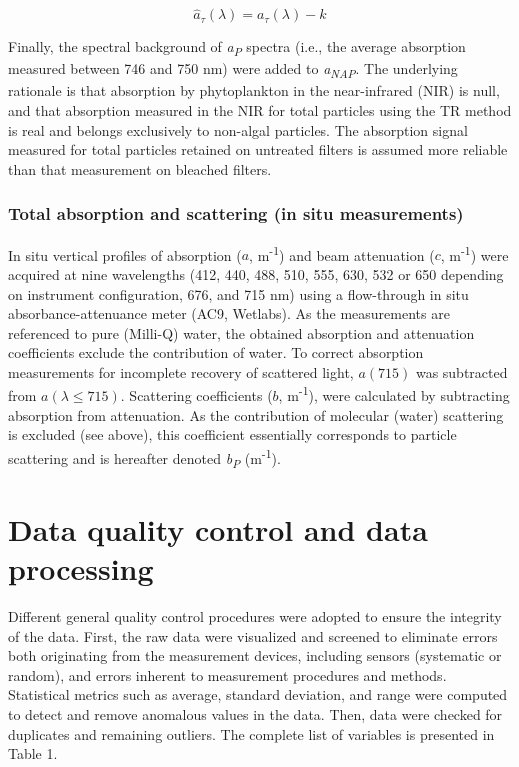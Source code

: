 \documentclass[essd, manuscript]{copernicus}
\begin{document}
\begin{equation}
    \hat{a}_\tau(\lambda) = a_\tau(\lambda) - k
\end{equation}

Finally, the spectral background of \textit{a\textsubscript{P}} spectra (i.e., the average absorption measured between 746 and 750 nm) were added to \textit{a\textsubscript{NAP}}. The underlying rationale is that absorption by phytoplankton in the near-infrared (NIR) is null, and that absorption measured in the NIR for total particles using the TR method is real \citep{Tassan2003} and belongs exclusively to non-algal particles. The absorption signal measured for total particles retained on untreated filters is assumed more reliable than that measurement on bleached filters.

\subsubsection{Total absorption and scattering (in situ measurements)}

In situ vertical profiles of absorption ($a$, m\textsuperscript{-1}) and beam attenuation ($c$, m\textsuperscript{-1}) were acquired at nine wavelengths (412, 440, 488, 510, 555, 630, 532 or 650 depending on instrument configuration, 676, and 715 nm) using a flow-through in situ absorbance-attenuance meter (AC9, Wetlabs). As the measurements are referenced to pure (Milli-Q) water, the obtained absorption and attenuation coefficients exclude the contribution of water. To correct absorption measurements for incomplete recovery of scattered light, $a(715)$ was subtracted from $a(\lambda \le 715)$. Scattering coefficients ($b$, m\textsuperscript{-1}), were calculated by subtracting absorption from attenuation. As the contribution of molecular (water) scattering is excluded (see above), this coefficient essentially corresponds to particle scattering and is hereafter denoted \textit{b\textsubscript{P}} (m\textsuperscript{-1}).

\section{Data quality control and data processing}

Different general quality control procedures were adopted to ensure the integrity of the data. First, the raw data were visualized and screened to eliminate errors both originating from the measurement devices, including sensors (systematic or random), and errors inherent to measurement procedures and methods. Statistical metrics such as average, standard deviation, and range were computed to detect and remove anomalous values in the data. Then, data were checked for duplicates and remaining outliers. The complete list of variables is presented in Table 1.
\end{document}
